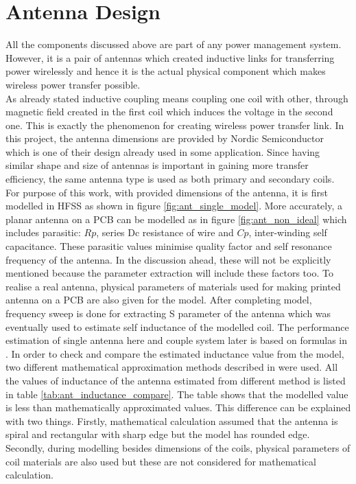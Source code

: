 \documentclass[12pt,a4paper,UKenglish]{article}
\begin{document}
\clearpage
\newpage

\section{Antenna Design}

All the components discussed above are part of any power management system. However, it is  a pair of 
antennas which created inductive links for transferring power wirelessly and hence it is the actual physical 
component which makes wireless power transfer possible. \\


As already stated inductive coupling means coupling one coil with other, through magnetic field created in the 
first coil which induces the voltage in the second one. This is exactly the phenomenon for creating wireless 
power transfer link. In this project, the antenna dimensions are provided by Nordic Semiconductor which is one 
of their design already used in some application. Since having similar shape and size of antennas is important 
in gaining more transfer efficiency, the same antenna type is used as both primary and secondary coils. \\


For purpose of this work, with provided dimensions of the antenna, it is first modelled in HFSS as shown in 
figure \ref{fig:ant_single_model}. More accurately, a planar antenna on a PCB can be modelled as in figure 
\ref{fig:ant_non_ideal} which includes parasitic: $Rp$, series Dc resistance of wire and $Cp$, inter-winding 
self capacitance. These parasitic values minimise quality factor and self resonance frequency of the antenna. 
In the discussion ahead, these will not be explicitly mentioned because the parameter extraction will include these factors too.
To realise a real antenna, physical parameters of materials used for making 
printed antenna on a PCB are also given for the model.  After completing model, frequency sweep is done for extracting S parameter of the 
antenna which was eventually used to estimate  self inductance of the modelled coil. The performance estimation of 
single antenna here and couple system later is based on formulas in \cite{ant_SZ_formula}. In order to check and compare the estimated inductance value from 
the model, two different mathematical approximation methods described in \cite{ant_inductance_calculation} were used. All the values of 
inductance of the antenna estimated from different method is listed in table \ref{tab:ant_inductance_compare}. The table shows that the 
modelled value is less than mathematically approximated values. This difference can be explained with two things. 
Firstly, mathematical calculation assumed that the antenna is spiral and rectangular with sharp edge but the model has 
rounded edge. Secondly, during modelling besides dimensions of the coils, physical parameters of coil materials are also used 
but these are not considered for mathematical calculation.\\
\end{document}
